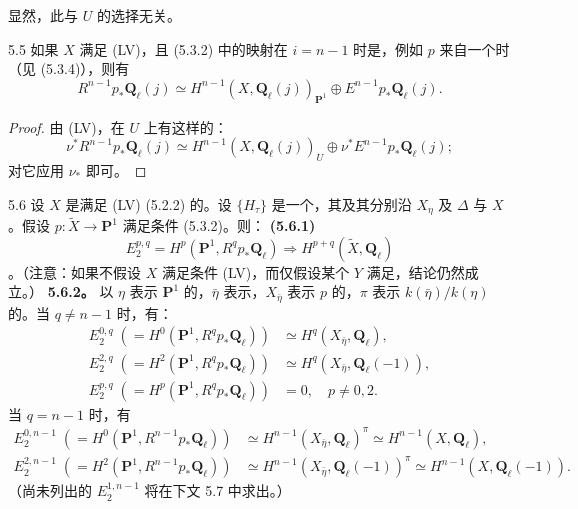 显然，此与 $U$ 的选择无关。
\begin{SGAresult}{}{5.5}
如果 $X$ 满足 (LV)，且 (5.3.2) 中的映射在 $i=n-1$ 时是，例如 $p$ 来自一个时（见 (5.3.4)），则有
\begin{equation}\tag{5.5.1}R^{n-1}p_*\mathbf Q_\ell(j)\simeq H^{n-1}(X,\mathbf Q_\ell(j))_{\mathbf P^1}\oplus E^{n-1}p_*\mathbf Q_\ell(j).\end{equation}
\end{SGAresult}
\begin{proof}
由 (LV)，在 $U$ 上有这样的：
\begin{equation}\tag{5.5.2}\nu^*R^{n-1}p_*\mathbf Q_\ell(j)\simeq H^{n-1}(X,\mathbf Q_\ell(j))_U\oplus\nu^*E^{n-1}p_*\mathbf Q_\ell(j);\end{equation}
对它应用 $\nu_*$ 即可。
\end{proof}
\begin{SGAresult}{}{5.6}
设 $X$ 是满足 (LV) (5.2.2) 的。设 $\{H_\tau\}$ 是一个，其及其分别沿 $X_\eta$ 及 $\Delta$ 与 $X$ 。假设 $p:\widetilde X\to\mathbf P^1$ 满足条件 (5.3.2)。则：
\textbf{(5.6.1)} 
\[E_2^{p,q}=H^p(\mathbf P^1,R^qp_*\mathbf Q_\ell)\Longrightarrow H^{p+q}(\widetilde X,\mathbf Q_\ell)\]
。（注意：如果不假设 $X$ 满足条件 (LV)，而仅假设某个 $Y$ 满足，结论仍然成立。）
\textbf{5.6.2。} 以 $\eta$ 表示 $\mathbf P^1$ 的，$\bar\eta$ 表示，$X_{\bar\eta}$ 表示 $p$ 的，$\pi$ 表示 $k(\bar\eta)/k(\eta)$ 的。当 $q\neq n-1$ 时，有：
\begin{align}E_2^{0,q}\;(=H^0(\mathbf P^1,R^qp_*\mathbf Q_\ell))&\simeq H^q(X_{\bar\eta},\mathbf Q_\ell),\tag{5.6.2.1}\\
E_2^{2,q}\;(=H^2(\mathbf P^1,R^qp_*\mathbf Q_\ell))&\simeq H^q(X_{\bar\eta},\mathbf Q_\ell(-1)),\tag{5.6.2.2}\\
E_2^{p,q}\;(=H^p(\mathbf P^1,R^qp_*\mathbf Q_\ell))&=0,\quad p\neq0,2.\tag{5.6.2.3}\end{align}
当 $q=n-1$ 时，有
\begin{align}
E_2^{0,n-1}\;(=H^0(\mathbf P^1,R^{n-1}p_*\mathbf Q_\ell))&\simeq H^{n-1}(X_{\bar\eta},\mathbf Q_\ell)^\pi\simeq H^{n-1}(X,\mathbf Q_\ell),\tag{5.6.2.4}\\
E_2^{2,n-1}\;(=H^2(\mathbf P^1,R^{n-1}p_*\mathbf Q_\ell))&\simeq H^{n-1}(X_{\bar\eta},\mathbf Q_\ell(-1))^\pi\simeq H^{n-1}(X,\mathbf Q_\ell(-1)).\tag{5.6.2.5}
\end{align}
（尚未列出的 $E_2^{1,n-1}$ 将在下文 5.7 中求出。）
\end{SGAresult}
